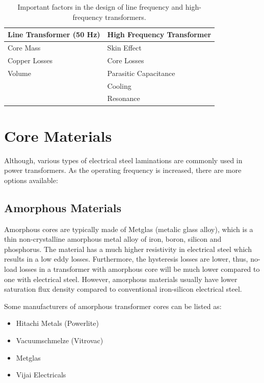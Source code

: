 \documentclass[a4paper, 11pt]{article} %
\begin{document}
\begin{table}[]
\begin{center}
\begin{tabular}{ll}
Line Transformer (50 Hz) & High Frequency Transformer\\
\hline
Core Mass & Skin Effect\\
Copper Losses & Core Losses\\
Volume & Parasitic Capacitance\\
& Cooling \\
& Resonance \\
\hline
\end{tabular} 
\end{center}
\caption{Important factors in the design of line frequency and high-frequency transformers.}
\label{important}
\end{table}


\section{Core Materials}

Although, various types of electrical steel laminations are commonly used in power transformers. As the operating frequency is increased, there are more options available:

\subsection*{Amorphous Materials}

Amorphous cores are typically made of Metglas (metalic glass alloy), which is a thin non-crystalline amorphous metal alloy of iron, boron, silicon and phosphorus. The material has a much higher resistivity in electrical steel which results in a low eddy losses. Furthermore, the hysteresis losses are lower, thus, no-load losses in a transformer with amorphous core will be much lower compared to one with electrical steel. However, amorphous materials usually have lower saturation flux density compared to conventional iron-silicon electrical steel.

Some manufacturers of amorphous transformer cores can be listed as:

\begin{itemize}
  \item Hitachi Metals (Powerlite)
  \item Vacuumschmelze (Vitrovac)
  \item Metglas
  \item Vijai Electricals
\end{itemize}
\end{document}
